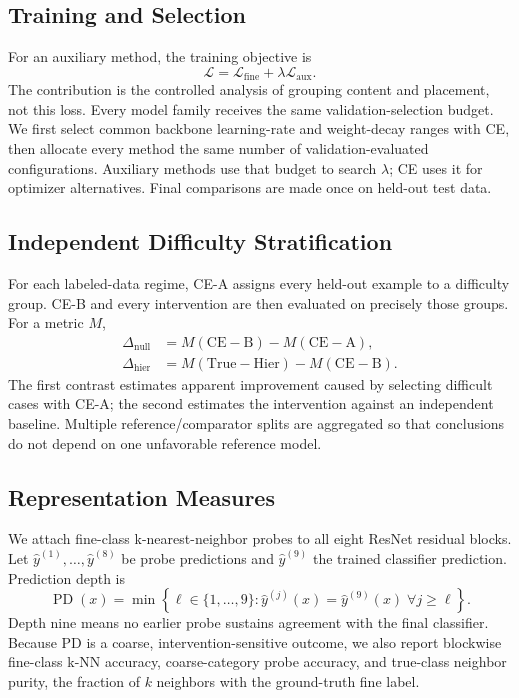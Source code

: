 \documentclass[conference]{IEEEtran}
\begin{document}
\subsection{Training and Selection}
For an auxiliary method, the training objective is
\begin{equation}
\mathcal{L}=\mathcal{L}_{\mathrm{fine}}+\lambda\mathcal{L}_{\mathrm{aux}}.
\label{eq:objective}
\end{equation}
The contribution is the controlled analysis of grouping content and placement, not this loss. Every model family receives the same validation-selection budget. We first select common backbone learning-rate and weight-decay ranges with CE, then allocate every method the same number of validation-evaluated configurations. Auxiliary methods use that budget to search \(\lambda\); CE uses it for optimizer alternatives. Final comparisons are made once on held-out test data.

\subsection{Independent Difficulty Stratification}
For each labeled-data regime, CE-A assigns every held-out example to a difficulty group. CE-B and every intervention are then evaluated on precisely those groups. For a metric \(M\),
\begin{equation}
\begin{aligned}
\Delta_{\mathrm{null}} &= M(\mathrm{CE\! -\!B})-M(\mathrm{CE\! -\!A}),\\
\Delta_{\mathrm{hier}} &= M(\mathrm{True\! -\!Hier})-M(\mathrm{CE\! -\!B}).
\end{aligned}
\label{eq:independent-null}
\end{equation}
The first contrast estimates apparent improvement caused by selecting difficult cases with CE-A; the second estimates the intervention against an independent baseline. Multiple reference/comparator splits are aggregated so that conclusions do not depend on one unfavorable reference model.

\subsection{Representation Measures}
We attach fine-class k-nearest-neighbor probes to all eight ResNet residual blocks. Let \(\hat y^{(1)},\ldots,\hat y^{(8)}\) be probe predictions and \(\hat y^{(9)}\) the trained classifier prediction. Prediction depth is
\begin{equation}
\operatorname{PD}(x)=\min\left\{\ell\in\{1,\ldots,9\}:\hat y^{(j)}(x)=\hat y^{(9)}(x)\;\forall j\geq\ell\right\}.
\label{eq:pd}
\end{equation}
Depth nine means no earlier probe sustains agreement with the final classifier. Because PD is a coarse, intervention-sensitive outcome, we also report blockwise fine-class k-NN accuracy, coarse-category probe accuracy, and true-class neighbor purity, the fraction of \(k\) neighbors with the ground-truth fine label.
\end{document}
